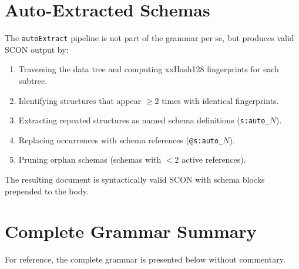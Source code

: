 \documentclass[11pt, a4paper]{article}
\begin{document}
\section{Auto-Extracted Schemas}
\label{sec:autoextract}

The \texttt{autoExtract} pipeline is not part of the grammar per se, but
produces valid SCON output by:

\begin{enumerate}
\item Traversing the data tree and computing xxHash128 fingerprints for
      each subtree.
\item Identifying structures that appear $\geq 2$ times with identical
      fingerprints.
\item Extracting repeated structures as named schema definitions
      (\texttt{s:auto\_$N$}).
\item Replacing occurrences with schema references (\texttt{@s:auto\_$N$}).
\item Pruning orphan schemas (schemas with $< 2$ active references).
\end{enumerate}

\noindent The resulting document is syntactically valid SCON with schema
blocks prepended to the body.

\section{Complete Grammar Summary}
\label{sec:summary}

For reference, the complete grammar is presented below without commentary.
\end{document}
